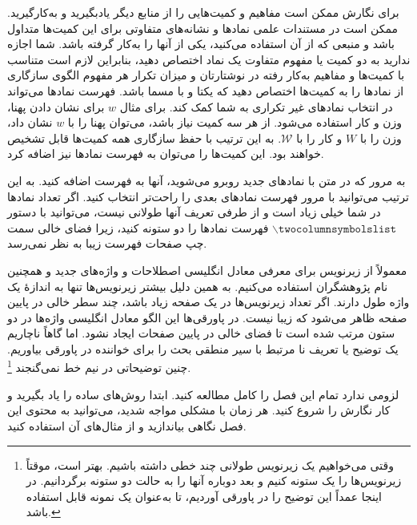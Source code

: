 برای نگارش 
\thesis 
ممکن است مفاهیم و کمیت‌هایی را از منابع دیگر یادبگیرید و به‌کارگیرید. ممکن است در مستندات علمی نمادها و نشانه‌های متفاوتی برای این کمیت‌ها متداول باشد و منبعی که از آن استفاده می‌کنید، یکی از آنها را به‌کار گرفته باشد. شما اجازه ندارید به دو کمیت یا مفهوم متفاوت یک نماد اختصاص دهید، بنابراین لازم است متناسب با کمیت‌ها و مفاهیم به‌کار رفته در نوشتارتان و میزان تکرار هر مفهوم الگوی سازگاری از نمادها را به کمیت‌ها اختصاص دهید که یکتا و با مسما باشد. فهرست نمادها می‌تواند در انتخاب نمادهای غیر تکراری به شما کمک کند. برای مثال $w$ برای نشان دادن پهنا، وزن و کار استفاده می‌شود. از هر سه کمیت نیاز باشد، می‌توان پهنا را با $w$ نشان داد، وزن را با $W$ و کار را با
$\mathcal{W}$. 
به این ترتیب با حفظ سازگاری همه کمیت‌ها قابل تشخیص خواهند بود. این کمیت‌ها را می‌توان به فهرست نمادها نیز اضافه کرد.

به مرور که در متن با نمادهای جدید روبرو می‌شوید، آنها به فهرست اضافه کنید. به این ترتیب می‌توانید با مرور فهرست نمادهای بعدی را راحت‌تر انتخاب کنید. 
اگر تعداد نمادها در 
\thesis 
شما خیلی زیاد است و از طرفی تعریف آنها طولانی نیست، می‌توانید با دستور 
$\backslash\texttt{twocolumnsymbolslist}$ 
فهرست نمادها را دو ستونه کنید، زیرا فضای خالی سمت چپ صفحات فهرست زیبا به نظر نمی‌رسد.

\normalfootnotes
معمولاً از زیرنویس برای معرفی معادل انگلیسی اصطلاحات و واژه‌های جدید و همچنین نام پژوهشگران استفاده می‌کنیم. به همین دلیل بیشتر زیرنویس‌ها تنها به اندازهٔ یک واژه طول دارند. اگر تعداد زیرنویس‌ها در یک صفحه زیاد باشد، چند سطر خالی در پایین صفحه ظاهر می‌شود که زیبا نیست. در پاورقی‌ها این الگو معادل انگلیسی واژه‌ها در دو ستون مرتب شده است تا فضای خالی در پایین صفحات ایجاد نشود. اما گاهاً ناچاریم یک توضیح یا تعریف نا مرتبط با سیر منطقی بحث را برای خواننده در پاورقی بیاوریم. چنین توضیحاتی در نیم خط نمی‌گنجند%
\footnote{
وقتی می‌خواهیم یک زیرنویس طولانی چند خطی داشته باشیم. بهتر است، موقتاً زیرنویس‌ها را یک ستونه کنیم و بعد دوباره آنها را به حالت دو ستونه برگردانیم. در اینجا عمداً این توضیح را در پاورقی آوردیم، تا به‌عنوان یک نمونه قابل استفاده باشد.}.
\twocolumnfootnotes

لزومی ندارد تمام این فصل را کامل مطالعه کنید. ابتدا روش‌های ساده را یاد بگیرید و کار نگارش 
\thesis  
را شروع کنید. هر زمان با مشکلی مواجه شدید، می‌توانید به محتوی این فصل نگاهی بیاندازید و از مثال‌های آن استفاده کنید.


